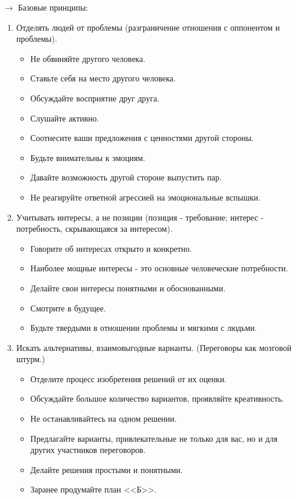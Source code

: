 \documentclass[12pt,a4paper]{report}
\begin{document}
\medskip 
$\rightarrow$ Базовые принципы:
\begin{enumerate}
	\item Отделять людей от проблемы (разграничение отношения с оппонентом и проблемы).
	\begin{itemize}
		\item Не обвиняйте другого человека.
		\item Ставьте себя на место другого человека.
		\item Обсуждайте восприятие друг друга.
		\item Слушайте активно.
		\item Соотнесите ваши предложения с ценностями другой стороны.
		\item Будьте внимательны к эмоциям.
		\item Давайте возможность другой стороне выпустить пар.
		\item Не реагируйте ответной агрессией на эмоциональные вспышки.
	\end{itemize}
	\item Учитывать интересы, а не позиции (позиция - требование; интерес - потребность, скрывающаяся за интересом).
	\begin{itemize}
		\item Говорите об интересах открыто и конкретно.
		\item Наиболее мощные интересы - это основные человеческие потребности.
		\item Делайте свои интересы понятными и обоснованными.
		\item Смотрите в будущее.
		\item Будьте твердыми в отношении проблемы и мягкими с людьми.
	\end{itemize}
	\item Искать альтернативы, взаимовыгодные варианты. (Переговоры как мозговой штурм.)
	\begin{itemize}
		\item Отделите процесс изобретения решений от их оценки.
		\item Обсуждайте большое количество вариантов, проявляйте креативность.
		\item Не останавливайтесь на одном решении.
		\item Предлагайте варианты, привлекательные не только для вас, но и для других участников переговоров.
		\item Делайте решения простыми и понятными.
		\item Заранее продумайте план <<Б>>.
	\end{itemize}

\end{enumerate}
\end{document}
